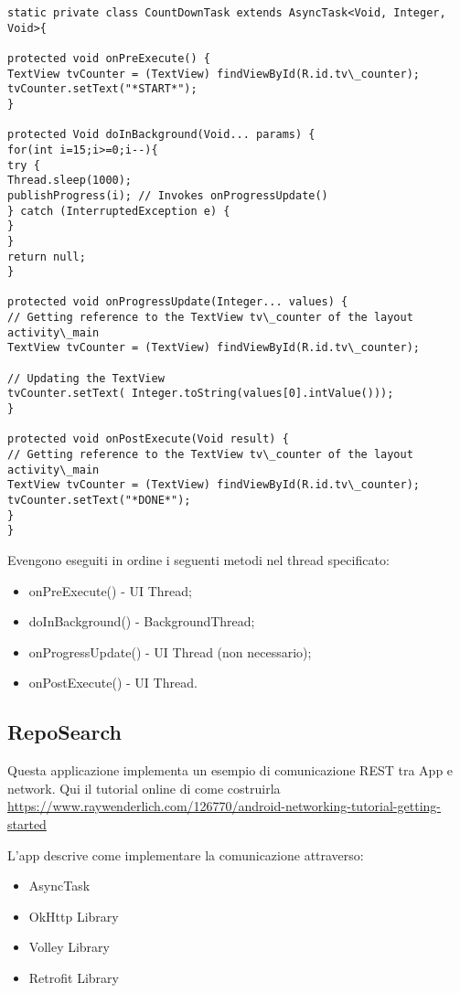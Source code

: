 \begin{lstlisting}
static private class CountDownTask extends AsyncTask<Void, Integer, Void>{

protected void onPreExecute() {
TextView tvCounter = (TextView) findViewById(R.id.tv\_counter);
tvCounter.setText("*START*");
}

protected Void doInBackground(Void... params) {
for(int i=15;i>=0;i--){
try {
Thread.sleep(1000);
publishProgress(i); // Invokes onProgressUpdate()
} catch (InterruptedException e) {
}
}
return null;
}

protected void onProgressUpdate(Integer... values) {
// Getting reference to the TextView tv\_counter of the layout activity\_main
TextView tvCounter = (TextView) findViewById(R.id.tv\_counter);

// Updating the TextView
tvCounter.setText( Integer.toString(values[0].intValue()));
}

protected void onPostExecute(Void result) {
// Getting reference to the TextView tv\_counter of the layout activity\_main
TextView tvCounter = (TextView) findViewById(R.id.tv\_counter);
tvCounter.setText("*DONE*");
}
}
\end{lstlisting}

Evengono eseguiti in ordine i seguenti metodi nel thread specificato:
\begin{itemize}
	\item onPreExecute() - UI Thread;
	\item doInBackground() - BackgroundThread;
	\item onProgressUpdate() - UI Thread (non necessario);
	\item onPostExecute() - UI Thread.

\end{itemize}

	\subsection{RepoSearch}
	Questa applicazione implementa un esempio di comunicazione REST tra App
e network. Qui il tutorial online di come costruirla
\url{
https://www.raywenderlich.com/126770/android-networking-tutorial-getting-started
}

	L'app descrive come implementare la comunicazione attraverso:
	\begin{itemize}
		\item AsyncTask
		\item OkHttp Library
		\item Volley Library
		\item Retrofit Library
	\end{itemize}


